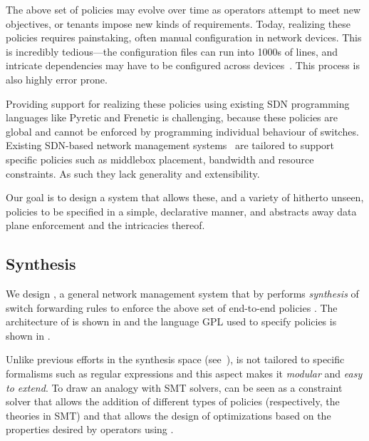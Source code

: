 The above set of policies may evolve over time as operators attempt to
meet new objectives, or tenants impose new kinds of
requirements. Today, realizing these policies requires painstaking,
often manual configuration in network devices. This is incredibly
tedious---the configuration files can run into 1000s of lines, and
intricate dependencies may have to be configured across
devices~\cite{benson:complexity:nsdi2009,mpa-imc15}. This process is also highly 
error prone.

Providing support for realizing these policies using existing SDN
programming languages like Pyretic and Frenetic is challenging,
because these policies are global and cannot be enforced by
programming individual behaviour of switches. Existing SDN-based
network management systems~\cite{simple,merlin,oneswitch} are tailored
to support specific policies such as middlebox placement, bandwidth
and resource constraints. As such they lack generality and
extensibility.

Our goal is to design a system that allows these, and a variety of
hitherto unseen, policies to be specified in a simple, declarative
manner, and abstracts away data plane enforcement and the intricacies
thereof.
  
\subsection{Synthesis} \label{sec:synthesis} 



We design \name, a general network management system that 
by performs {\em synthesis} of switch forwarding
rules to enforce the above set of end-to-end policies . The architecture of \name
is shown in  and the 
language GPL used to specify policies
is shown in .

Unlike previous efforts in the synthesis space (see~\cite{netgen,merlin}), \Name is
not tailored to specific formalisms such as regular expressions and
this aspect makes it {\em modular} and {\em easy to extend}.
To draw an analogy with SMT solvers, \Name can be seen as a constraint
solver that allows the addition of different types of policies
(respectively, the theories in SMT) and that allows the design of
optimizations based on the properties desired by 
  operators using \Name. 
  
